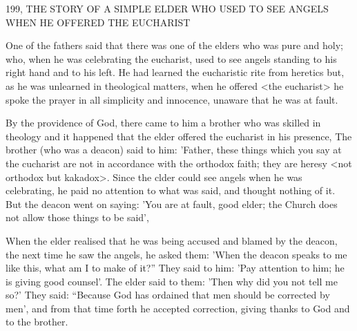 199, THE STORY OF A SIMPLE ELDER
WHO USED TO SEE ANGELS WHEN HE OFFERED
THE EUCHARIST

One of the fathers said that there was one of the elders who was
pure and holy; who, when he was celebrating the eucharist, used to
see angels standing to his right hand and to his left. He had learned
the eucharistic rite from heretics but, as he was unlearned in
theological matters, when he offered <the eucharist> he spoke the
prayer in all simplicity and innocence, unaware that he was at fault.

By the providence of God, there came to him a brother who
was skilled in theology and it happened that the elder offered the
eucharist in his presence, The brother (who was a deacon) said to
him: 'Father, these things which you say at the cucharist are not in
accordance with the orthodox faith; they are heresy <not orthodox
but kakadox>. Since the clder could see angels when he was
celebrating, he paid no attention to what was said, and thought
nothing of it. But the deacon went on saying: 'You are at fault,
good elder; the Church does not allow those things to be said',

When the elder realised that he was being accused and blamed by
the deacon, the next time he saw the angels, he asked them: 'When
the deacon speaks to me like this, what am I to make of it?” They
said to him: 'Pay attention to him; he is giving good counsel'. The
elder said to them: 'Then why did you not tell me so?' They said:
“Because God has ordained that men should be corrected by men',
and from that time forth he accepted correction, giving thanks to
God and to the brother.

